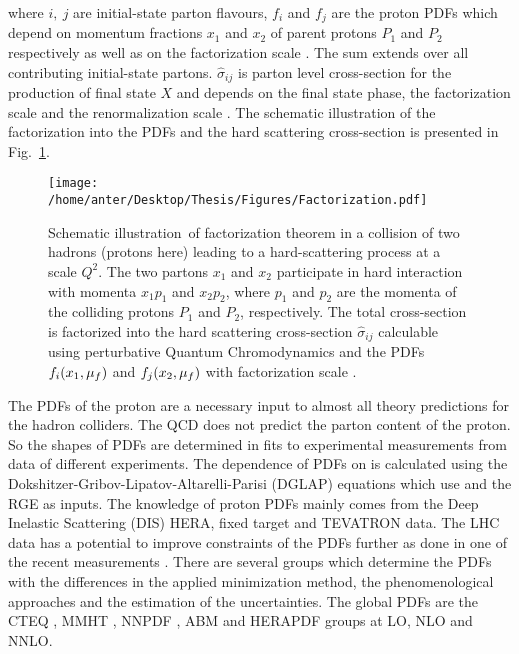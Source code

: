 where $i,~j$ are initial-state parton flavours, $f_i$ and $f_{j}$ are the proton PDFs which depend on momentum fractions $x_1$ and $x_2$ of parent protons $P_1$ and $P_2$ respectively as well as on the factorization scale \muf. The sum extends over all contributing initial-state partons. $\hat\sigma_{ij}$ is parton level cross-section for the production of final state $X$ and depends on the final state phase, the factorization scale \muf and the renormalization scale \mur. The schematic illustration of the factorization into the PDFs and the hard scattering cross-section is presented in Fig.~\ref{fig:fac}.
\begin{figure}[!h]
\begin{center}
\hspace*{-7mm}
\texttt{[image: /home/anter/Desktop/Thesis/Figures/Factorization.pdf]}\\
\vspace*{4mm}
\caption[Factorization]{Schematic illustration\footnotemark~of factorization theorem in a collision of two hadrons (protons here) leading to a hard-scattering process at a scale $Q^2$. The two partons $x_1$ and $x_2$ participate in hard interaction with momenta $x_1p_1$ and $x_2p_2$, where $p_1$ and $p_2$ are the momenta of the colliding protons $P_1$ and $P_2$, respectively. The total cross-section is factorized into the hard scattering cross-section $\hat\sigma_{ij}$ calculable using perturbative Quantum Chromodynamics and the PDFs $f_i(x_1,\mu_f)$ and $f_j(x_2,\mu_f)$ with factorization scale \muf.}
\label{fig:fac}
\end{center}
\end{figure}
The PDFs of the proton are a necessary input to almost all theory predictions for the hadron colliders. The QCD does not predict the parton content of the proton. So the shapes of PDFs are determined in fits to experimental measurements from data of different experiments. The dependence of PDFs on \muf is calculated using the Dokshitzer-Gribov-Lipatov-Altarelli-Parisi (DGLAP) \cite{Gribov:1972ri,Dokshitzer:1977sg,Altarelli:1977zs} equations which use \alps and the RGE as inputs. The knowledge of proton PDFs mainly comes from the Deep Inelastic Scattering (DIS) HERA, fixed target and TEVATRON data. The LHC data has a potential to improve constraints of the PDFs further as done in one of the recent measurements \cite{Sirunyan:2017skj}. There are several groups which determine the PDFs with the differences in the applied minimization method, the phenomenological approaches and the estimation of the uncertainties. The global PDFs are the CTEQ \cite{Dulat:2015mca}, MMHT \cite{Harland-Lang:2014zoa}, NNPDF \cite{Ball:2014uwa}, ABM \cite{Alekhin:2012ig} and HERAPDF \cite{Abramowicz:2015mha} groups at LO, NLO and NNLO.

